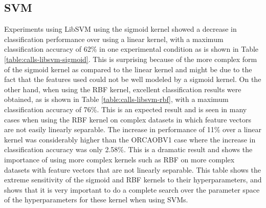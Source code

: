 \documentclass[12pt,oneside]{book}
\begin{document}
%
%
\subsection{SVM}

Experiments using LibSVM using the sigmoid kernel showed a decrease in
classification performance over using a linear kernel, with a maximum
classification accuracy of 62\% in one experimental condition as is
shown in Table \ref{table:calls-libsvm-sigmoid}.  This is surprising
because of the more complex form of the sigmoid kernel as compared to
the linear kernel and might be due to the fact that the features used
could not be well modeled by a sigmoid kernel.  On the other hand,
when using the RBF kernel, excellent classification results were
obtained, as is shown in Table \ref{table:calls-libsvm-rbf}, with a
maximum classification accuracy of 76\%.  This is an expected result
and is seen in many cases when using the RBF kernel on complex
datasets in which feature vectors are not easily linearly separable.
The increase in performance of 11\% over a linear kernel was
considerably higher than the ORCAOBV1 case where the increase in
classification accuracy was only 2.58\%.  This is a dramatic result
and shows the importance of using more complex kernels such as RBF on
more complex datasets with feature vectors that are not linearly
separable.  This table shows the extreme sensitivity of the sigmoid
and RBF kernels to their hyperparameters, and shows that it is very
important to do a complete search over the parameter space of the
hyperparameters for these kernel when using SVMs.
\end{document}

